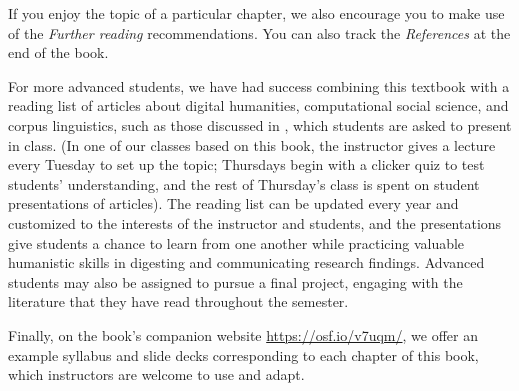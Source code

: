 If you enjoy the topic of a particular chapter, we also encourage you
to make use of the \emph{Further reading} recommendations.  You can
also track the \emph{References} at the end of the book.

For more advanced students, we have had success combining this textbook with a reading list of articles about digital humanities,  computational social science, and corpus linguistics, such as those discussed in , which students are asked to present in class.  (In one of our classes based on this book, the instructor gives a lecture every Tuesday to set up the topic; Thursdays begin with a clicker quiz to test students' understanding, and the rest of Thursday's class is spent on student presentations of articles). The reading list can be updated every year and customized to the interests of the instructor and students, and the presentations give students a chance to learn from one another while practicing valuable humanistic skills in digesting and communicating research findings.  Advanced students may also be assigned to pursue a final project, engaging with the literature that they have read throughout the semester.


Finally, on the book's companion website \url{https://osf.io/v7uqm/}, we offer an example syllabus and slide decks corresponding to each chapter of this book, which instructors are welcome to use and adapt.

